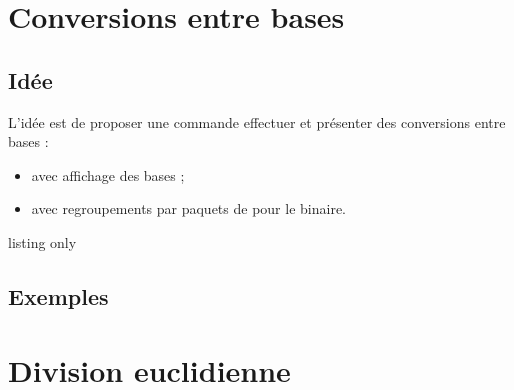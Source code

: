 \pagebreak

\section{Conversions entre bases}\label{basetobase}

\subsection{Idée}

\begin{tipblock}
 L'idée est de proposer une commande effectuer et présenter des conversions entre bases :

\begin{itemize}
	\item avec affichage des bases ;
	\item avec regroupements par paquets de pour le binaire.
\end{itemize}
\vspace*{-\baselineskip}\leavevmode
\end{tipblock}

\begin{PresCodeTexPL}{listing only}

\end{PresCodeTexPL}

\subsection{Exemples}

\begin{PresCodePL}{}
\par
{}\par
{}\par
{}\par
{}\par
{}
\end{PresCodePL}

\pagebreak

\section{Division euclidienne}\label{diveucl}

